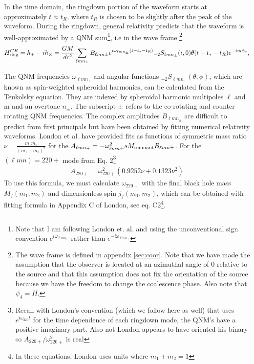 \documentclass[aps,prd,amsmath,showpacs,amssymb,superscriptaddress,nofootinbib,longbibliography,eqsecnum,preprintnumbers]{revtex4-1}
\newcommand{\Sph}{{}_{-2}S_{\ell m n_{\pm}}}
\newcommand{\mul}{{\ell m n_{\pm}}}
\begin{document}
In the time domain, the ringdown portion of the waveform starts at approximately $t\approx t_R$, where $t_R$ is chosen to be slightly after the peak of the waveform. During the ringdown, general relativity predicts that the waveform is well-approximated by a QNM sum\footnote{Note that I am following London et. al. and using the unconventional sign convention $e^{i\omega_\mul}$ rather than $e^{-i\omega_\mul}$}, i.e in the wave frame \footnote{The wave frame is defined in appendix \ref{sec:coor}. Note that we have made the assumption that the observer is located at an azimuthal angle of 0 relative to the source and that this assumption does not fix the orientation of the source because we have the freedom to change the coalescence phase. Also note that $\psi_4= \ddot H$.}
\begin{align}
H_{\rm ring}^{GR}=h_+-ih_\times=\frac{GM}{dc^2}\sum_{\ell m n_{\pm}}B_{\ell m n\pm}e^{i\omega_{\ell m n_{\pm}}(t-t_*-t_R)}\Sph(\iota,0)\theta(t-t_*-t_R)e^{-im\phi_*},
\end{align}

The QNM frequencies $\omega_\mul$ and angular functions $\Sph(\theta, \phi)$, which are known as spin-weighted spheroidal harmonics, can be calculated from the Teukolsky equation. They are indexed by spheroidal harmonic multipoles $\ell$ and m and an overtone $n_\pm$. The subscript $\pm$ refers to the co-rotating and counter rotating QNM frequencies. The complex amplitudes $B_\mul$ are difficult to predict from first principals but have been obtained by fitting numerical relativity waveforms. London et al. \cite{London:2014cma} have provided fits as functions of symmetric mass ratio $\nu=\frac{m_1m_2}{(m_1+m_2)^2}$ for the $A_{\ell m n_\pm}=-\omega_{\ell mn\pm}^2sM_{\rm remnant}B_{\ell mn \pm}$. For the $(\ell m n) =220+$ mode from Eq. 2\footnote{Recall with London's convention (which we follow here as well) that uses $e^{i\omega_{220}t}$ for the time dependence of each ringdown mode, the QNM's have a positive imaginary part. Also not London appears to have oriented his binary so $A_{220+}/\omega_{220+}^2$ is real}
\begin{align}
A_{220+}=\omega_{220+}^2\left(0.9252 \nu +0.1323\nu^2 \right)
\label{eq:A220}
\end{align}
To use this formula, we must calculate $\omega_{220+}$ with the final black hole mass $M_f(m_1,m_2)$ and dimensionless spin $j_f(m_1,m_2)$, which can be obtained with fitting formula in Appendix C of London, see eq. C2\footnote{In these equations, London uses units where $m_1+m_2 =1$}.
\end{document}
